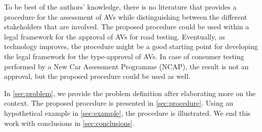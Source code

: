 To be best of the authors' knowledge, there is no literature that provides a procedure for the assessment of AVs while distinguishing between the different stakeholders that are involved. The proposed procedure could be used within a legal framework for the approval of AVs for road testing. 
Eventually, as technology improves, the procedure might be a good starting point for developing the legal framework for the type-approval of AVs.
In case of consumer testing performed by a New Car Assessment Programme (NCAP), the result is not an approval, but the proposed procedure could be used as well. 

In \cref{sec:problem}, we provide the problem definition after elaborating more on the context. The proposed procedure is presented in \cref{sec:procedure}. Using an hypothetical example in \cref{sec:example}, the procedure is illustrated. We end this work with conclusions in \cref{sec:conclusions}.
